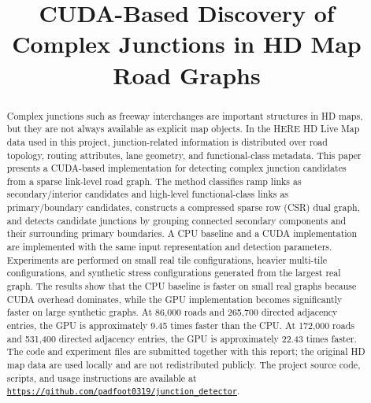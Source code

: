 \documentclass[conference]{IEEEtran}
\begin{document}
\title{CUDA-Based Discovery of Complex Junctions in HD Map Road Graphs}

\author{
}

\maketitle

\begin{abstract}
Complex junctions such as freeway interchanges are important structures in HD maps, but they are not always available as explicit map objects. In the HERE HD Live Map data used in this project, junction-related information is distributed over road topology, routing attributes, lane geometry, and functional-class metadata. This paper presents a CUDA-based implementation for detecting complex junction candidates from a sparse link-level road graph. The method classifies ramp links as secondary/interior candidates and high-level functional-class links as primary/boundary candidates, constructs a compressed sparse row (CSR) dual graph, and detects candidate junctions by grouping connected secondary components and their surrounding primary boundaries. A CPU baseline and a CUDA implementation are implemented with the same input representation and detection parameters. Experiments are performed on small real tile configurations, heavier multi-tile configurations, and synthetic stress configurations generated from the largest real graph. The results show that the CPU baseline is faster on small real graphs because CUDA overhead dominates, while the GPU implementation becomes significantly faster on large synthetic graphs. At 86,000 roads and 265,700 directed adjacency entries, the GPU is approximately 9.45 times faster than the CPU. At 172,000 roads and 531,400 directed adjacency entries, the GPU is approximately 22.43 times faster. The code and experiment files are submitted together with this report; the original HD map data are used locally and are not redistributed publicly.
The project source code, scripts, and usage instructions are available at \href{https://github.com/padfoot0319/junction_detector}{\texttt{https://github.com/padfoot0319/junction\_detector}}.
\end{abstract}
\end{document}
